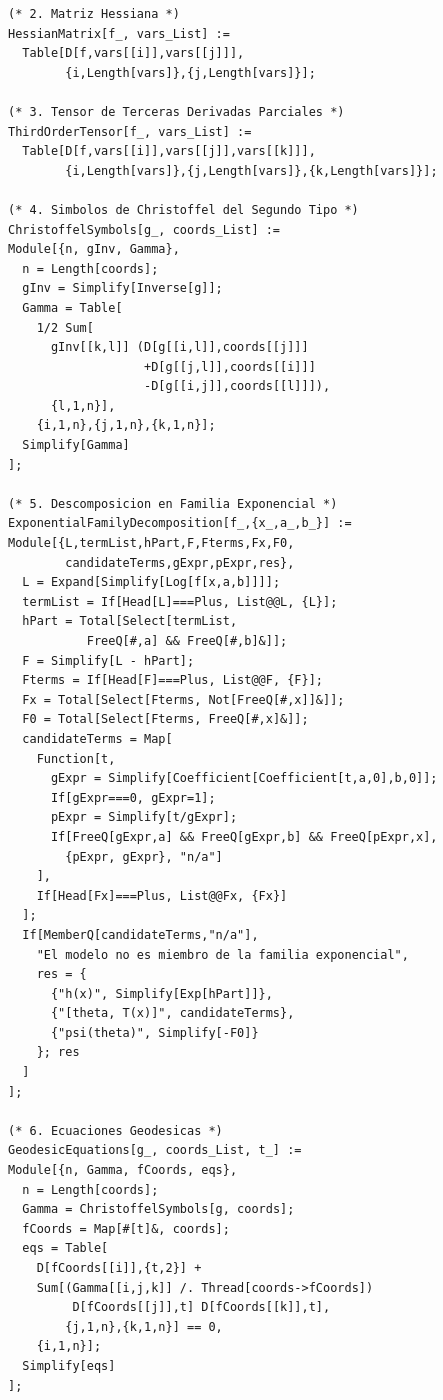 \begin{lstlisting}
(* 2. Matriz Hessiana *)
HessianMatrix[f_, vars_List] :=
  Table[D[f,vars[[i]],vars[[j]]],
        {i,Length[vars]},{j,Length[vars]}];

(* 3. Tensor de Terceras Derivadas Parciales *)
ThirdOrderTensor[f_, vars_List] :=
  Table[D[f,vars[[i]],vars[[j]],vars[[k]]],
        {i,Length[vars]},{j,Length[vars]},{k,Length[vars]}];

(* 4. Simbolos de Christoffel del Segundo Tipo *)
ChristoffelSymbols[g_, coords_List] :=
Module[{n, gInv, Gamma},
  n = Length[coords];
  gInv = Simplify[Inverse[g]];
  Gamma = Table[
    1/2 Sum[
      gInv[[k,l]] (D[g[[i,l]],coords[[j]]]
                   +D[g[[j,l]],coords[[i]]]
                   -D[g[[i,j]],coords[[l]]]),
      {l,1,n}],
    {i,1,n},{j,1,n},{k,1,n}];
  Simplify[Gamma]
];

(* 5. Descomposicion en Familia Exponencial *)
ExponentialFamilyDecomposition[f_,{x_,a_,b_}] :=
Module[{L,termList,hPart,F,Fterms,Fx,F0,
        candidateTerms,gExpr,pExpr,res},
  L = Expand[Simplify[Log[f[x,a,b]]]];
  termList = If[Head[L]===Plus, List@@L, {L}];
  hPart = Total[Select[termList,
           FreeQ[#,a] && FreeQ[#,b]&]];
  F = Simplify[L - hPart];
  Fterms = If[Head[F]===Plus, List@@F, {F}];
  Fx = Total[Select[Fterms, Not[FreeQ[#,x]]&]];
  F0 = Total[Select[Fterms, FreeQ[#,x]&]];
  candidateTerms = Map[
    Function[t,
      gExpr = Simplify[Coefficient[Coefficient[t,a,0],b,0]];
      If[gExpr===0, gExpr=1];
      pExpr = Simplify[t/gExpr];
      If[FreeQ[gExpr,a] && FreeQ[gExpr,b] && FreeQ[pExpr,x],
        {pExpr, gExpr}, "n/a"]
    ],
    If[Head[Fx]===Plus, List@@Fx, {Fx}]
  ];
  If[MemberQ[candidateTerms,"n/a"],
    "El modelo no es miembro de la familia exponencial",
    res = {
      {"h(x)", Simplify[Exp[hPart]]},
      {"[theta, T(x)]", candidateTerms},
      {"psi(theta)", Simplify[-F0]}
    }; res
  ]
];

(* 6. Ecuaciones Geodesicas *)
GeodesicEquations[g_, coords_List, t_] :=
Module[{n, Gamma, fCoords, eqs},
  n = Length[coords];
  Gamma = ChristoffelSymbols[g, coords];
  fCoords = Map[#[t]&, coords];
  eqs = Table[
    D[fCoords[[i]],{t,2}] +
    Sum[(Gamma[[i,j,k]] /. Thread[coords->fCoords])
         D[fCoords[[j]],t] D[fCoords[[k]],t],
        {j,1,n},{k,1,n}] == 0,
    {i,1,n}];
  Simplify[eqs]
];


\end{lstlisting}
